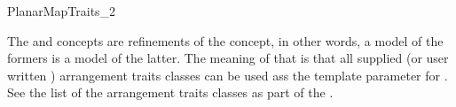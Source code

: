 \begin{ccRefConcept}{PlanarMapTraits_2}
      

\ccHasModels

  The  and
   concepts are refinements of the
   concept, in other words, a model of the
  formers is a model of the latter.  The meaning of that is that all
  supplied (or user written ) arrangement traits classes can be used
  ass the  template parameter for
  .  See the list of the arrangement
  traits classes as part of the .
  
\end{ccRefConcept} %

\ccRefPageEnd















